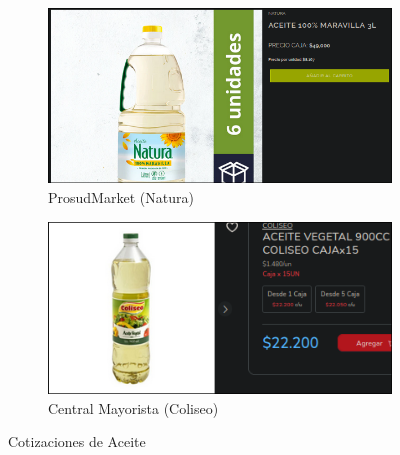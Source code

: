 \documentclass[12pt]{article}
\begin{document}
    \begin{figure}[H]
        \centering
        \begin{subfigure}{0.48\textwidth}
            \centering
            \includegraphics[width=\linewidth]{prosud} %
            \caption{ProsudMarket (Natura)}
            \label{fig:prosudmarket}
        \end{subfigure}
        \hfill
        \begin{subfigure}{0.48\textwidth}
            \centering
            \includegraphics[width=\linewidth]{aceite} %
            \caption{Central Mayorista (Coliseo)}
            \label{fig:central_mayorista_aceite}
        \end{subfigure}
        \caption{Cotizaciones de Aceite}
        \label{fig:cotizaciones_aceite}
    \end{figure}
\end{document}
